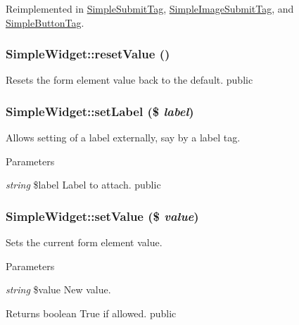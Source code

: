 Reimplemented in \hyperlink{class_simple_submit_tag_ab9604de20ab0d5d86de8603780c5fd61}{SimpleSubmitTag}, \hyperlink{class_simple_image_submit_tag_ab38d48f8710f8df763ff0753f8035146}{SimpleImageSubmitTag}, and \hyperlink{class_simple_button_tag_a5efa27afe64fbb8ce8ef546df97c0db5}{SimpleButtonTag}.\hypertarget{class_simple_widget_a30843333201512c78950addd7589516a}{
\subsubsection[{resetValue}]{\setlength{\rightskip}{0pt plus 5cm}SimpleWidget::resetValue ()}}
\label{class_simple_widget_a30843333201512c78950addd7589516a}
Resets the form element value back to the default.  public \hypertarget{class_simple_widget_a8e03ad451a0a611ae3d94afcdb67a724}{
\subsubsection[{setLabel}]{\setlength{\rightskip}{0pt plus 5cm}SimpleWidget::setLabel (\$ {\em label})}}
\label{class_simple_widget_a8e03ad451a0a611ae3d94afcdb67a724}
Allows setting of a label externally, say by a label tag. 
\begin{DoxyParams}{Parameters}
\item[{\em string}]\$label Label to attach.  public \end{DoxyParams}
\hypertarget{class_simple_widget_a9e048a450e2d29a601e672deda9fa869}{
\subsubsection[{setValue}]{\setlength{\rightskip}{0pt plus 5cm}SimpleWidget::setValue (\$ {\em value})}}
\label{class_simple_widget_a9e048a450e2d29a601e672deda9fa869}
Sets the current form element value. 
\begin{DoxyParams}{Parameters}
\item[{\em string}]\$value New value. \end{DoxyParams}
\begin{DoxyReturn}{Returns}
boolean True if allowed.  public 
\end{DoxyReturn}


